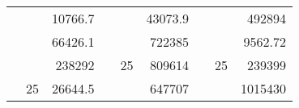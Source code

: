 \begin{table}[H]
\begin{tabular}{|ccrccrccc}
\rowcolor[HTML]{DAE8FC} 
\multicolumn{1}{|c|}{\cellcolor[HTML]{FFFFC7}}                                & \multicolumn{1}{c|}{\cellcolor[HTML]{DAE8FC}}                      & \multicolumn{1}{r|}{\cellcolor[HTML]{DAE8FC}10766.7}   & \multicolumn{1}{c|}{\cellcolor[HTML]{FFFFC7}}                                & \multicolumn{1}{c|}{\cellcolor[HTML]{DAE8FC}}                       & \multicolumn{1}{r|}{\cellcolor[HTML]{DAE8FC}43073.9}   & \multicolumn{1}{c|}{\cellcolor[HTML]{FFFFC7}}                                & \multicolumn{1}{c|}{\cellcolor[HTML]{DAE8FC}}                      & \multicolumn{1}{r|}{\cellcolor[HTML]{DAE8FC}492894}    \\ \cline{3-3} \cline{6-6} \cline{9-9} 
\multicolumn{1}{|c|}{\cellcolor[HTML]{FFFFC7}}                                & \multicolumn{1}{c|}{\cellcolor[HTML]{DAE8FC}}                      & \multicolumn{1}{r|}{\cellcolor[HTML]{DDFDFF}66426.1}   & \multicolumn{1}{c|}{\cellcolor[HTML]{FFFFC7}}                                & \multicolumn{1}{c|}{\cellcolor[HTML]{DAE8FC}}                       & \multicolumn{1}{r|}{\cellcolor[HTML]{DDFDFF}722385}    & \multicolumn{1}{c|}{\cellcolor[HTML]{FFFFC7}}                                & \multicolumn{1}{c|}{\cellcolor[HTML]{DAE8FC}}                      & \multicolumn{1}{r|}{\cellcolor[HTML]{DDFDFF}9562.72}   \\ \cline{3-3} \cline{6-6} \cline{9-9} 
\rowcolor[HTML]{DAE8FC} 
\multicolumn{1}{|c|}{\cellcolor[HTML]{FFFFC7}}                                & \multicolumn{1}{c|}{\cellcolor[HTML]{DAE8FC}}                      & \multicolumn{1}{r|}{\cellcolor[HTML]{DAE8FC}238292}    & \multicolumn{1}{c|}{\cellcolor[HTML]{FFFFC7}}                                & \multicolumn{1}{c|}{\multirow{-9}{*}{\cellcolor[HTML]{DAE8FC}25}}   & \multicolumn{1}{r|}{\cellcolor[HTML]{DAE8FC}809614}    & \multicolumn{1}{c|}{\cellcolor[HTML]{FFFFC7}}                                & \multicolumn{1}{c|}{\multirow{-9}{*}{\cellcolor[HTML]{DAE8FC}25}}  & \multicolumn{1}{r|}{\cellcolor[HTML]{DAE8FC}239399}    \\ \cline{3-3} \cline{5-6} \cline{8-9} 
\multicolumn{1}{|c|}{\cellcolor[HTML]{FFFFC7}}                                & \multicolumn{1}{c|}{\multirow{-10}{*}{\cellcolor[HTML]{DAE8FC}25}} & \multicolumn{1}{r|}{\cellcolor[HTML]{DDFDFF}26644.5}   & \multicolumn{1}{c|}{\cellcolor[HTML]{FFFFC7}}                                & \multicolumn{1}{c|}{\cellcolor[HTML]{DDFDFF}}                       & \multicolumn{1}{r|}{\cellcolor[HTML]{DAE8FC}647707}    & \multicolumn{1}{c|}{\cellcolor[HTML]{FFFFC7}}                                & \multicolumn{1}{c|}{\cellcolor[HTML]{DDFDFF}}                      & \multicolumn{1}{r|}{\cellcolor[HTML]{DAE8FC}1015430}   \\ \cline{2-3} \cline{6-6} \cline{9-9} 

\end{tabular}
\end{table}
